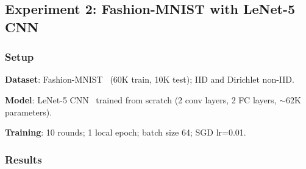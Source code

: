 \documentclass[10pt,twocolumn,letterpaper]{article}
\begin{document}
%                     
\subsection{Experiment 2: Fashion-MNIST with LeNet-5 CNN}
\label{sec:exp_cnn}
%                     

\subsubsection{Setup}

\textbf{Dataset}: Fashion-MNIST~\cite{xiao2017fashion} (60K train, 10K test); IID and Dirichlet non-IID.

\textbf{Model}: LeNet-5 CNN~\cite{lecun1998gradient} trained from scratch (2 conv layers, 2 FC layers, $\sim$62K parameters).

\textbf{Training}: 10 rounds; 1 local epoch; batch size 64; SGD lr=0.01.

\subsubsection{Results}
\end{document}
